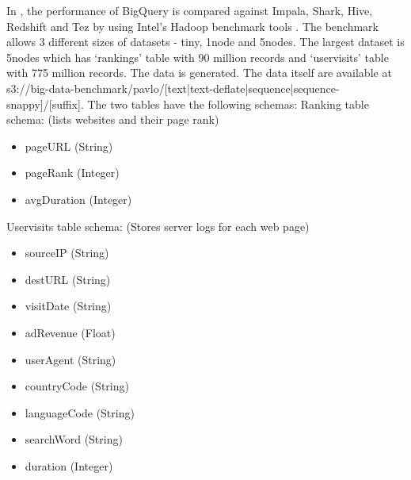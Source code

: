 \documentclass[9pt,twocolumn,twoside]{../../styles/osajnl}
\begin{document}
\noindent
In \cite{www-benchmarks-bigguery}, the performance of BigQuery is
compared against Impala, Shark, Hive, Redshift and Tez by using
Intel's Hadoop benchmark tools . The
benchmark allows 3 different sizes of datasets - tiny, 1node and
5nodes. The largest dataset is 5nodes which has ‘rankings’ table with
90 million records and ‘uservisits’ table with 775 million
records. The data is generated. The data itself are available at
s3://big-data-benchmark/pavlo/[text|text-deflate|sequence|sequence-snappy]/[suffix]. The
two tables have the following schemas:\newline \newline
\noindent
Ranking table schema: (lists websites and their page rank)
\begin{itemize}[noitemsep,topsep=0pt] \item pageURL (String) \item pageRank (Integer) \item avgDuration (Integer) \newline
\end{itemize}
\noindent
Uservisits table schema: (Stores server logs for each web page)
\begin{itemize}[noitemsep,topsep=0pt] \item sourceIP (String) \item destURL (String) \item visitDate (String) \item adRevenue (Float) \item userAgent (String) \item countryCode (String) \item languageCode (String) \item searchWord (String) \item duration (Integer) \newline
\end{itemize}
\end{document}
